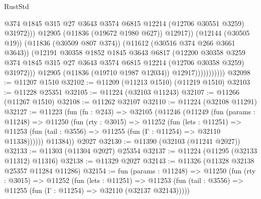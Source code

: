 \begin{lexlean}{RustStd}
\begin{coremodule}
                                      @374
                                      @1845
                                      @315
                                      @27
                                      @3643
                                      @3574
                                      @6815
                                      @12214
                                      (@12706 @30551 @3259)
                                      @31972)))
                                @12905
                                (@11836 (@19672 @1980 @627))
                                @12917))
                            (@12144 (@30505 @19))
                            (@11836 (@30509 @807 @374))
                            (@11612 (@30516 @374 @266 @3661 @3643))
                            (@12191
                              @30358
                              @1852
                              @1845
                              @3643
                              @6817
                              (@12200
                                @30358
                                @3259
                                @374
                                @1845
                                @315
                                @27
                                @3643
                                @3574
                                @6815
                                @12214
                                (@12706 @30358 @3259)
                                @31972)))
                          @12905
                          (@11836 (@19710 @1987 @12034))
                          @12917)))))))))))
@32098 := @11207 @1510
@32102 := @11209 (@11213 @1510) (@11219 @1510)
@32103 := @11228 @25351
@32105 := @11224 (@32103 @11243)
@32107 := @11266 (@11267 @1510)
@32108 := @11262 @32107
@32110 := @11224 (@32108 @11291)
@32127 := @11223
    (fun (fn : @243) =>
    @32105
      (@11246
        (@11249
          (fun (params : @11248) =>
          @11250
            (fun (rty : @3015) =>
            @11252
              (fun (lets : @11251) =>
              @11253 (fun (tail : @3556) => @11255 (fun (Γ : @11254) => @32110 @11338))))))
        @11384))
    @2027
@32130 := @11390 (@32103 (@11241 @2027))
@32133 := @11303 (@11304 @2027) @25354
@32137 := @11224 (@11295 (@32133 @11312) @11316)
@32138 := @11329 @2027
@32143 := @11326 (@11328 @32138 @25357 @11284 @11286)
@32154 := fun (params : @11248) =>
  @11250
    (fun (rty : @3015) =>
    @11252
      (fun (lets : @11251) =>
      @11253 (fun (tail : @3556) => @11255 (fun (Γ : @11254) => @32110 (@32137 @32143)))))

\end{coremodule}
\end{lexlean}
